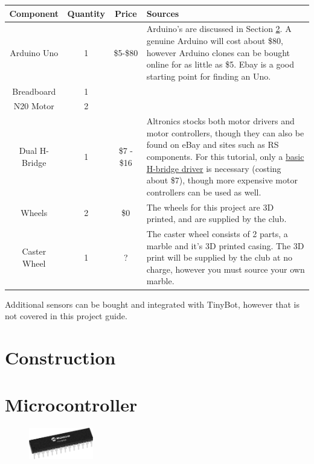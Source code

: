 \documentclass[a4paper,12pt]{article}
\begin{document}
\begin{tabularx}{\linewidth}{cccX}
    \toprule
    Component & Quantity & Price & Sources \\ \midrule
    Arduino Uno & 1 & \$5-\$80 & Arduino's are discussed in Section \ref{sec:microcontroller}. A genuine Arduino will cost about \$80, however Arduino clones can be bought online for as little as \$5. Ebay is a good starting point for finding an Uno. \\
    Breadboard & 1 & & \\
    N20 Motor & 2 & & \\
    Dual H-Bridge & 1 & \$7 - \$16&   Altronics stocks both motor drivers and motor controllers, though they can also be found on eBay and sites such as RS components. For this tutorial, only a \href{https://www.altronics.com.au/p/z2900-l293d-motor-drive-ic/}{basic H-bridge driver} is necessary (costing about \$7), though more expensive motor controllers can be used as well.\\
    Wheels & 2& \$0 & The wheels for this project are 3D printed, and are supplied by the club. \\
    Caster Wheel & 1 & ? & The caster wheel consists of 2 parts, a marble and it's 3D printed casing. The 3D print will be supplied by the club at no charge, however you must source your own marble.\\
    \bottomrule
\end{tabularx}

\bigskip

Additional sensors can be bought and integrated with TinyBot, however that is not covered in this project guide. 

\section{Construction}

\pagebreak
\section{Microcontroller} \label{sec:microcontroller}
\begin{figure}
    \includegraphics[width=0.25\textwidth]{medium-ATmega328-SPDIP-28.png}
    \label{fig:microchip}
\end{figure}
\end{document}

